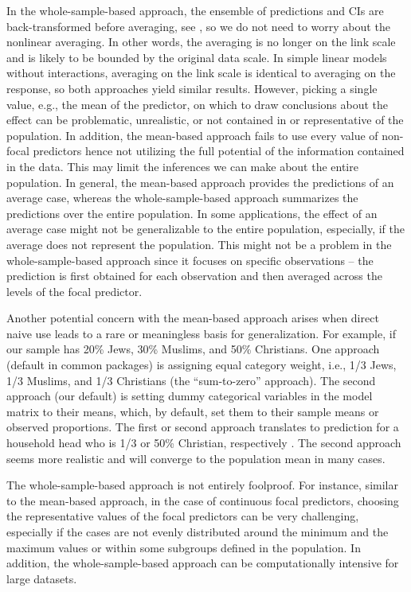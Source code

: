 In the whole-sample-based approach, the ensemble of predictions and CIs are back-transformed before averaging, see , so we do not need to worry about the nonlinear averaging. In other words, the averaging is no longer on the link scale and is likely to be bounded by the original data scale. In simple linear models without interactions, averaging on the link scale is identical to averaging on the response, so both approaches yield similar results. However, picking a single value, e.g., the mean of the predictor, on which to draw conclusions about the effect can be problematic, unrealistic, or not contained in or representative of the population. In addition, the mean-based approach fails to use every value of non-focal predictors hence not utilizing the full potential of the information contained in the data. This may limit the inferences we can make about the entire population. In general, the mean-based approach provides the predictions of an average case, whereas the whole-sample-based approach summarizes the predictions over the entire population. In some applications, the effect of an average case might not be generalizable to the entire population, especially, if the average does not represent the population. This might not be a problem in the whole-sample-based approach since it focuses on specific observations -- the prediction is first obtained for each observation and then averaged across the levels of the focal predictor.

Another potential concern with the mean-based approach arises when direct naive use leads to a rare or meaningless basis for generalization. For example, if our sample has 20\% Jews, 30\% Muslims, and 50\% Christians. One approach (default in common packages) is assigning equal category weight, i.e., 1/3 Jews, 1/3 Muslims, and 1/3 Christians (the ``sum-to-zero'' approach). The second approach (our default) is setting dummy categorical variables in the model matrix to their means, which, by default, set them to their sample means or observed proportions. The first or second approach translates to prediction for a household head who is 1/3 or 50\% Christian, respectively \citep{hanmer2013behind}. The second approach seems more realistic and will converge to the population mean in many cases.

The whole-sample-based approach is not entirely foolproof. For instance, similar to the mean-based approach, in the case of continuous focal predictors, choosing the representative values of the focal predictors can be very challenging, especially if the cases are not evenly distributed around the minimum and the maximum values or within some subgroups defined in the population. In addition, the whole-sample-based approach can be computationally intensive for large datasets.



